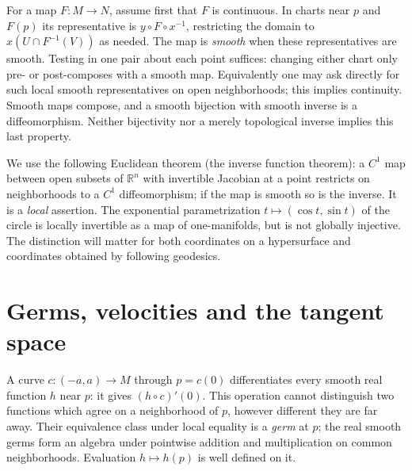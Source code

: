 For a map $F:M\to N$, assume first that $F$ is continuous. In charts near $p$ and $F(p)$ its representative is $y\circ F\circ x^{-1}$, restricting the domain to $x(U\cap F^{-1}(V))$ as needed. The map is \emph{smooth} when these representatives are smooth. Testing in one pair about each point suffices: changing either chart only pre- or post-composes with a smooth map. Equivalently one may ask directly for such local smooth representatives on open neighborhoods; this implies continuity. Smooth maps compose, and a smooth bijection with smooth inverse is a diffeomorphism. Neither bijectivity nor a merely topological inverse implies this last property.

We use the following Euclidean theorem (the inverse function theorem): a $C^1$ map between open subsets of $\mathbb R^n$ with invertible Jacobian at a point restricts on neighborhoods to a $C^1$ diffeomorphism; if the map is smooth so is the inverse. It is a \emph{local} assertion. The exponential parametrization $t\mapsto(\cos t,\sin t)$ of the circle is locally invertible as a map of one-manifolds, but is not globally injective. The distinction will matter for both coordinates on a hypersurface and coordinates obtained by following geodesics.

\section{Germs, velocities and the tangent space}
A curve $c:(-a,a)\to M$ through $p=c(0)$ differentiates every smooth real function $h$ near $p$: it gives $(h\circ c)'(0)$. This operation cannot distinguish two functions which agree on a neighborhood of $p$, however different they are far away. Their equivalence class under local equality is a \emph{germ} at $p$; the real smooth germs form an algebra under pointwise addition and multiplication on common neighborhoods. Evaluation $h\mapsto h(p)$ is well defined on it.

